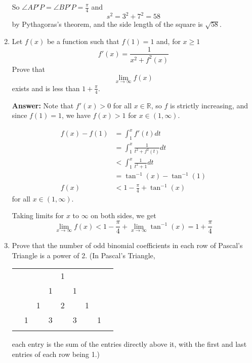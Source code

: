 \documentclass{article}
\begin{document}
\begin{enumerate}
    So $\angle AP'P = \angle BP'P = \frac{\pi}{4}$ and
    \[ s^2 = 3^2 + 7^2 = 58 \]
    by Pythagoras's theorem, and the side length of the square is $\sqrt{58}$.
    
    \item Let $f(x)$ be a function such that $f(1) = 1$ and, for $x \geq 1$
    \[f'(x) = \frac{1}{x^2+f^2(x)}\]
    Prove that \[\lim_{x \to \infty} f(x)\] exists and is less than $1 + \frac{\pi}{4}$.
    
    \textbf{Answer:} Note that $f'(x) > 0$ for all $x \in \mathbb{R}$, so $f$ is strictly increasing, and since $f(1)=1$, we have $f(x)> 1$ for $x \in (1,\infty)$.
    
    \begin{align*}
         f(x)-f(1) & = \int_1^x f'(t) dt \\
         & = \int_1^x \frac{1}{t^2 + f^2(t)} dt \\
         & < \int_1^x \frac{1}{t^2+1} dt \\
         & = \tan^{-1}(x) - \tan^{-1}(1) \\
         f(x) &< 1 - \frac{\pi}{4} + \tan^{-1}(x)
    \end{align*}
    for all $x \in (1,\infty)$.
    
    Taking limits for $x$ to $\infty$ on both sides, we get
\[ \lim_{x \to \infty} f(x) < 1 - \frac{\pi}{4} + \lim_{x \to \infty} \tan^{-1} (x) = 1 + \frac{\pi}{4} \]
    
    
    \item Prove that the number of odd binomial coefficients in each row of Pascal's Triangle is a power of 2. (In Pascal's Triangle, 
    \begin{center}
    \begin{tabular}{ccccccccc}
    &    &    &    &  1\\\noalign{\smallskip\smallskip}
    &    &    &  1 &    &  1\\\noalign{\smallskip\smallskip}
    &    &  1 &    &  2 &    &  1\\\noalign{\smallskip\smallskip}
    &  1 &    &  3 &    &  3 &    &  1\\\noalign{\smallskip\smallskip}
    \end{tabular}
    \end{center}
    each entry is the sum of the entries directly above it, with the first and last entries of each row being 1.)
    

\end{enumerate}
\end{document}
